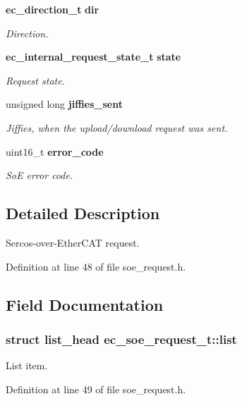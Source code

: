 \begin{DoxyCompactItemize}
{\bf ec\-\_\-direction\-\_\-t} {\bf dir}
\begin{DoxyCompactList}\small\item\em \-Direction. \end{DoxyCompactList}\item 
{\bf ec\-\_\-internal\-\_\-request\-\_\-state\-\_\-t} {\bf state}
\begin{DoxyCompactList}\small\item\em \-Request state. \end{DoxyCompactList}\item 
unsigned long {\bf jiffies\-\_\-sent}
\begin{DoxyCompactList}\small\item\em \-Jiffies, when the upload/download request was sent. \end{DoxyCompactList}\item 
uint16\-\_\-t {\bf error\-\_\-code}
\begin{DoxyCompactList}\small\item\em \-So\-E error code. \end{DoxyCompactList}\end{DoxyCompactItemize}


\subsection{\-Detailed \-Description}
\-Sercos-\/over-\/\-Ether\-C\-A\-T request. 

\-Definition at line 48 of file soe\-\_\-request.\-h.



\subsection{\-Field \-Documentation}
\subsubsection[{list}]{\setlength{\rightskip}{0pt plus 5cm}struct list\-\_\-head {\bf ec\-\_\-soe\-\_\-request\-\_\-t\-::list}}\label{structec__soe__request__t_a07cafa8f400f95ced4f6037629c979f6}


\-List item. 



\-Definition at line 49 of file soe\-\_\-request.\-h.

